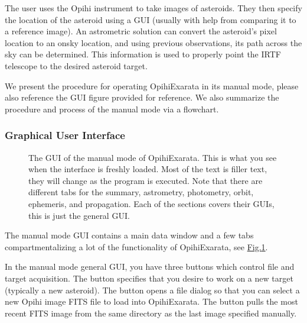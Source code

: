 \documentclass[letterpaper,11pt,english]{sphinxmanual}
\begin{document}
\sphinxAtStartPar
The user uses the Opihi instrument to take images of asteroids. They then
specify the location of the asteroid using a GUI (usually with help from
comparing it to a reference image). An astrometric solution can convert the
asteroid’s pixel location to an on\sphinxhyphen{}sky location, and using previous
observations, its path across the sky can be determined. This information is
used to properly point the IRTF telescope to the desired asteroid target.

\sphinxAtStartPar
We present the procedure for operating OpihiExarata in its manual mode,
please also reference the GUI figure provided for reference. We also summarize
the procedure and process of the manual mode via a flowchart.


\subsubsection{Graphical User Interface}
\label{\detokenize{user/manual_mode:graphical-user-interface}}\label{\detokenize{user/manual_mode:user-manual-mode-graphical-user-interface}}
\begin{figure}[htbp]
\centering
\capstart

\noindent{}
\caption{The GUI of the manual mode of OpihiExarata. This is what you see when
the interface is freshly loaded. Most of the text is filler text, they will
change as the program is executed. Note that there are different tabs for
the summary, astrometry, photometry, orbit, ephemeris, and propagation.
Each of the sections covers their GUIs, this is just the general GUI.}\label{\detokenize{user/manual_mode:id2}}\label{\detokenize{user/manual_mode:figure-manual-mode-gui-all}}\end{figure}

\sphinxAtStartPar
The manual mode GUI contains a main data window and a few tabs
compartmentalizing a lot of the functionality of OpihiExarata, see
\hyperref[\detokenize{user/manual_mode:figure-manual-mode-gui-all}]{Fig.\@ \ref{\detokenize{user/manual_mode:figure-manual-mode-gui-all}}}.

\sphinxAtStartPar
In the manual mode general GUI, you have three buttons which control file
and target acquisition. The  button specifies that you
desire to work on a new target (typically a new asteroid). The
 button opens a file dialog so that you can
select a new Opihi image FITS file to load into OpihiExarata. The
 button pulls the most recent FITS image from
the same directory as the last image specified manually.
\end{document}
